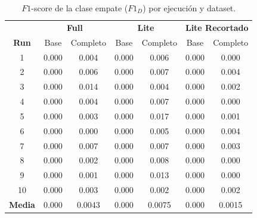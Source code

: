 \begin{table}[htbp]
	\centering
	\caption{$F1$-score de la clase empate ($F1_D$) por ejecuci\'on y dataset.}
	\label{tab:stage2_f1d}
	\begin{tabular}{ccccccc}
		\toprule
		& \multicolumn{2}{c|}{\textbf{Full}} & \multicolumn{2}{c|}{\textbf{Lite}} & \multicolumn{2}{c}{\textbf{Lite Recortado}} \\
		\textbf{Run} & Base & Completo & Base & Completo & Base & Completo \\
		\midrule
		1 & 0.000 & 0.004 & 0.000 & 0.006 & 0.000 & 0.000 \\
		2 & 0.000 & 0.006 & 0.000 & 0.007 & 0.000 & 0.004 \\
		3 & 0.000 & 0.014 & 0.000 & 0.004 & 0.000 & 0.002 \\
		4 & 0.000 & 0.004 & 0.000 & 0.007 & 0.000 & 0.000 \\
		5 & 0.000 & 0.003 & 0.000 & 0.017 & 0.000 & 0.001 \\
		6 & 0.000 & 0.000 & 0.000 & 0.005 & 0.000 & 0.004 \\
		7 & 0.000 & 0.007 & 0.000 & 0.007 & 0.000 & 0.003 \\
		8 & 0.000 & 0.002 & 0.000 & 0.008 & 0.000 & 0.000 \\
		9 & 0.000 & 0.001 & 0.000 & 0.013 & 0.000 & 0.000 \\
		10 & 0.000 & 0.003 & 0.000 & 0.002 & 0.000 & 0.002 \\
		\midrule
		\textbf{Media} & 0.000 & 0.0043 & 0.000 & 0.0075 & 0.000 & 0.0015 \\
		\bottomrule
	\end{tabular}
\end{table}